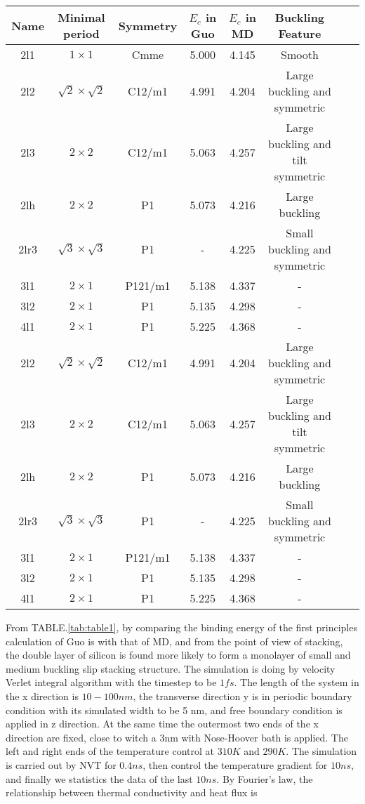 \documentclass[%
 reprint,
 amsmath,amssymb,
 aps,
 prb,
]{revtex4-1}
\begin{document}
\begin{table*}
\caption{\label{tab:table1}
Symmetry of the structures, binding energy $E_c(eV/Si)$ and structure features}
\begin{ruledtabular}
\begin{tabular}{cccccccc}
 Name
 &Minimal period
 &Symmetry
 &$E_c$ in Guo
 &$E_c$ in MD
 &Buckling Feature\\
\hline
2l1 & $1 \times 1$ & Cmme & 5.000 &4.145 &Smooth \\
2l2 & $\sqrt{2}\times\sqrt{2}$ & C12/m1 & 4.991 & 4.204 & Large buckling and symmetric\\
2l3 & $2 \times 2$ & C12/m1 & 5.063 & 4.257 & Large buckling and tilt symmetric\\
2lh & $2 \times 2$ & P1 & 5.073 & 4.216 & Large buckling\\
2lr3 & $\sqrt{3}\times\sqrt{3}$ & P1 & - & 4.225 & Small buckling and symmetric\\
3l1 & $2 \times 1$ & P121/m1 & 5.138 & 4.337 & -\\
3l2 & $2 \times 1$ & P1 & 5.135 & 4.298 & -\\
4l1 & $2 \times 1$ & P1 & 5.225 & 4.368 & -\\
2l2 &$\sqrt{2}\times\sqrt{2}$ & C12/m1 & 4.991 & 4.204 & Large buckling and symmetric\\
2l3 & $2 \times 2$ & C12/m1 & 5.063 & 4.257 & Large buckling and tilt symmetric\\
2lh & $2 \times 2$ & P1 & 5.073 & 4.216 & Large buckling\\
2lr3 & $\sqrt{3}\times\sqrt{3}$ & P1 & - & 4.225 & Small buckling and symmetric\\
3l1 & $2 \times 1$ & P121/m1 & 5.138 & 4.337 & -\\
3l2 & $2 \times 1$ & P1 & 5.135 & 4.298 & -\\
4l1 & $2 \times 1$ & P1 & 5.225 & 4.368 & -\\

\end{tabular}
\end{ruledtabular}
\end{table*}

From TABLE.\ref{tab:table1}, by comparing the binding energy of the first principles calculation of Guo is with that of MD, and from the point of view of stacking, the double layer of silicon is found more likely to form a monolayer of small and medium buckling slip stacking structure. The simulation is doing by velocity Verlet integral algorithm with the timestep to be $1 fs$. The length of the system in the x direction is $10 - 100nm$, the transverse direction y is in periodic boundary condition with its simulated width to be 5 nm, and free boundary condition is applied in z direction. At the same time the outermost two ends of the x direction are fixed, close to witch a 3nm with Nose-Hoover bath is applied. The left and right ends of the temperature control at $310K$ and $290K$. The simulation is carried out by NVT for $0.4ns$, then control the temperature gradient for $10 ns$, and finally we statistics the data of the last $10ns$. By Fourier's law, the relationship between thermal conductivity and heat flux is
\end{document}
